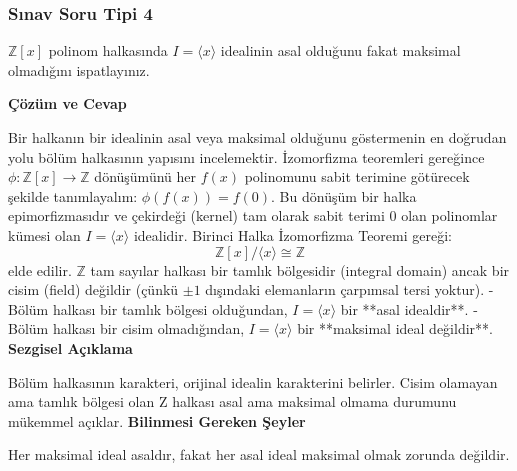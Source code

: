 \documentclass[11pt, a4paper]{article}
\newenvironment{cozum}{
    \vspace{0.5cm}
    \noindent\textcolor{green!60!black}{\faCheckCircle\enspace \textbf{\Large Çözüm ve Cevap}}\par\vspace{0.2cm}
}{}
\newenvironment{sezgisel}{
    \vspace{0.5cm}
    \noindent\textcolor{orange!80!black}{\faLightbulb\enspace \textbf{\Large Sezgisel Açıklama}}\par\vspace{0.2cm}
    \itshape
}{}
\newenvironment{bilgi}{
    \vspace{0.5cm}
    \noindent\textcolor{red!70!black}{\faExclamationTriangle\enspace \textbf{\Large Bilinmesi Gereken Şeyler}}\par\vspace{0.2cm}
}{}
\begin{document}
\subsubsection{Sınav Soru Tipi 4}
\begin{sinavbox}
$\mathbb{Z}[x]$ polinom halkasında $I = \langle x \rangle$ idealinin asal olduğunu fakat maksimal olmadığını ispatlayınız.
\end{sinavbox}
\begin{cozum}
Bir halkanın bir idealinin asal veya maksimal olduğunu göstermenin en doğrudan yolu bölüm halkasının yapısını incelemektir.
İzomorfizma teoremleri gereğince $\phi: \mathbb{Z}[x] \to \mathbb{Z}$ dönüşümünü her $f(x)$ polinomunu sabit terimine götürecek şekilde tanımlayalım: $\phi(f(x)) = f(0)$.
Bu dönüşüm bir halka epimorfizmasıdır ve çekirdeği (kernel) tam olarak sabit terimi 0 olan polinomlar kümesi olan $I = \langle x \rangle$ idealidir.
Birinci Halka İzomorfizma Teoremi gereği:
\[ \mathbb{Z}[x] / \langle x \rangle \cong \mathbb{Z} \]
elde edilir. 
$\mathbb{Z}$ tam sayılar halkası bir tamlık bölgesidir (integral domain) ancak bir cisim (field) değildir (çünkü $\pm 1$ dışındaki elemanların çarpımsal tersi yoktur).
- Bölüm halkası bir tamlık bölgesi olduğundan, $I = \langle x \rangle$ bir **asal idealdir**.
- Bölüm halkası bir cisim olmadığından, $I = \langle x \rangle$ bir **maksimal ideal değildir**.
\end{cozum}
\begin{sezgisel}
Bölüm halkasının karakteri, orijinal idealin karakterini belirler. Cisim olamayan ama tamlık bölgesi olan Z halkası asal ama maksimal olmama durumunu mükemmel açıklar.
\end{sezgisel}
\begin{bilgi}
Her maksimal ideal asaldır, fakat her asal ideal maksimal olmak zorunda değildir.
\end{bilgi}

\newpage
\end{document}
